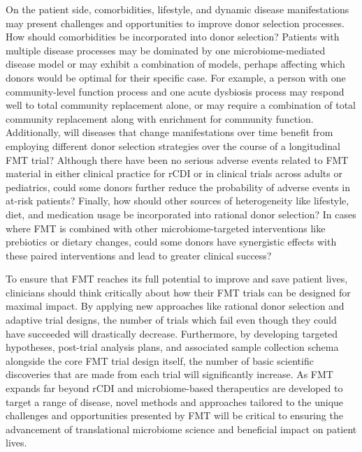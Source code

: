 On the patient side, comorbidities, lifestyle, and dynamic disease manifestations may present challenges and opportunities to improve donor selection processes.
How should comorbidities be incorporated into donor selection?
Patients with multiple disease processes may be dominated by one microbiome-mediated disease model or may exhibit a combination of models, perhaps affecting which donors would be optimal for their specific case.
For example, a person with one community-level function process and one acute dysbiosis process may respond well to total community replacement alone, or may require a combination of total community replacement along with enrichment for community function.
Additionally, will diseases that change manifestations over time benefit from employing different donor selection strategies over the course of a longitudinal FMT trial?
Although there have been no serious adverse events related to FMT material in either clinical practice for rCDI or in clinical trials across adults or pediatrics, could some donors further reduce the probability of adverse events in at-risk patients?
Finally, how should other sources of heterogeneity like lifestyle, diet, and medication usage be incorporated into rational donor selection?
In cases where FMT is combined with other microbiome-targeted interventions like prebiotics or dietary changes, could some donors have synergistic effects with these paired interventions and lead to greater clinical success?

To ensure that FMT reaches its full potential to improve and save patient lives, clinicians should think critically about how their FMT trials can be designed for maximal impact.
By applying new approaches like rational donor selection and adaptive trial designs, the number of trials which fail even though they could have succeeded will drastically decrease.
Furthermore, by developing targeted hypotheses, post-trial analysis plans, and associated sample collection schema alongside the core FMT trial design itself, the number of basic scientific discoveries that are made from each trial will significantly increase.
As FMT expands far beyond rCDI and microbiome-based therapeutics are developed to target a range of disease, novel methods and approaches tailored to the unique challenges and opportunities presented by FMT will be critical to ensuring the advancement of translational microbiome science and beneficial impact on patient lives.




